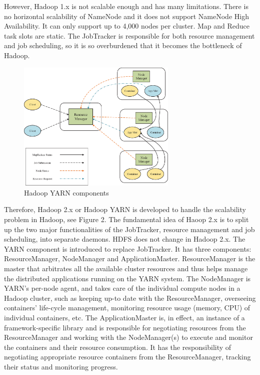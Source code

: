 
However, Hadoop 1.x is not scalable enough and has many limitations. There is no horizontal scalability of NameNode and it does not support NameNode High Availability. It can only support up to 4,000 nodes per cluster. Map and Reduce task slots are static. The JobTracker is responsible for both resource management and job scheduling, so it is so overburdened that it becomes the bottleneck of Hadoop. 

\begin{figure}[t]
  \centering
  \includegraphics[width=3in]{figs/yarn.eps}
  \caption{Hadoop YARN components}
  \label{fig:yarnoverview}
\end{figure}

Therefore, Hadoop 2.x or Hadoop YARN is developed to handle the scalability problem in Hadoop, see Figure 2. The fundamental idea of Haoop 2.x is to split up the two major functionalities of the JobTracker, resource management and job scheduling, into separate daemons. HDFS does not change in Hadoop 2.x. The YARN component is introduced to replace JobTracker. It has three components: ResourceManager, NodeManager and ApplicationMaster. ResourceManager is the master that arbitrates all the available cluster resources and thus helps manage the distributed applications running on the YARN system. The NodeManager is YARN’s per-node agent, and takes care of the individual compute nodes in a Hadoop cluster, such as keeping up-to date with the ResourceManager, overseeing containers’ life-cycle management, monitoring resource usage (memory, CPU) of individual containers, etc. The ApplicationMaster is, in effect, an instance of a framework-specific library and is responsible for negotiating resources from the ResourceManager and working with the NodeManager(s) to execute and monitor the containers and their resource consumption. It has the responsibility of negotiating appropriate resource containers from the ResourceManager, tracking their status and monitoring progress.



